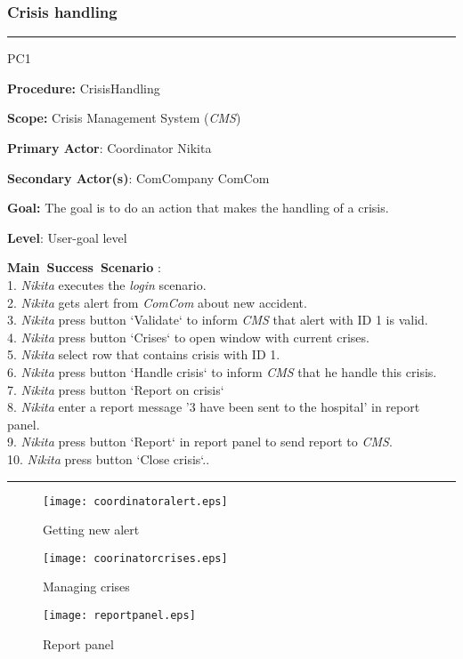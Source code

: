 \subsubsection{Crisis handling}
\vspace{0.5cm}
\hrule
\begin{lyxlist}{PC1}
\small{
\item [\textbf{Procedure:}] CrisisHandling
\item [\textbf{Scope:}]  Crisis Management System (\emph{CMS})
\item [\textbf{Primary Actor}:] Coordinator Nikita
\item [\textbf{Secondary Actor(s)}:] ComCompany ComCom
\item [\textbf{Goal:}] The goal is to do an action that makes the handling of a
crisis.
\item [\textbf{Level}:] User-goal level
\item [\textbf{Main~Success~Scenario}]:\\
1. \emph{Nikita} executes the \emph{login} scenario. \\
2. \emph{Nikita} gets alert from \emph{ComCom} about new accident. \\
3. \emph{Nikita} press button `Validate` to inform \emph{CMS} that alert with
ID 1 is valid.\\
4. \emph{Nikita} press button `Crises` to open window with current crises.\\
5. \emph{Nikita} select row that contains crisis with ID 1.\\
6. \emph{Nikita} press button `Handle crisis` to inform \emph{CMS} that he
handle this crisis.\\
7. \emph{Nikita} press button `Report on crisis`\\
8. \emph{Nikita} enter a report message '3 have been sent to the hospital' in
report panel.\\
9. \emph{Nikita} press button `Report` in report panel to send report to
\emph{CMS}.\\
10. \emph{Nikita} press button `Close crisis`..\\
}
\end{lyxlist}
\hrule
\vspace{0.5cm}

\begin{figure}[h]
    \texttt{[image: coordinatoralert.eps]}
	\caption{Getting new alert}
\end{figure}

\begin{figure}[h]
    \texttt{[image: coorinatorcrises.eps]}
	\caption{Managing crises}
\end{figure}


\begin{figure}[h]
    \texttt{[image: reportpanel.eps]}
	\caption{Report panel}
\end{figure}








